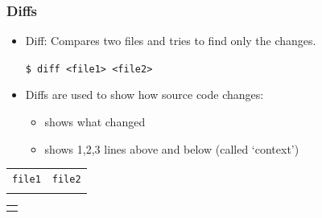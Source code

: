 \documentclass[ignoreframetext,envcountsect]{beamer}
\newif\ifsnop\snoptrue
\newcommand{\bi}{\begin{itemize}}
\newcommand{\ei}{\end{itemize}}
\newcommand{\cemph}[1]{{\color{red}#1}}
\begin{document}
\ifsnop
{}
\fi

\pagestyle{plain}

\ifsnop
\begin{frame}
\frametitle{Diffs}
\bi
\item
  Diff: Compares two files and tries to find only the changes.
  \medskip

  {\tt \$ diff <file1> <file2>}
\bigskip
\item
  Diffs are used to show how source code changes:
  \bi
  \item shows what changed
  \item shows 1,2,3 lines above and below (called `context')
  \ei
\ei
\end{frame}
\fi


\ifsnop
\begin{frame}
\scriptsize
\begin{tabular}{c@{\qquad}c}
\cemph{\tt file1} & \cemph{\tt file2} \\
 &

\end{tabular}
\medskip

\small
\begin{tabular}{c}
\cemph{{\tt \$ diff -c file1 file2}} \\

\end{tabular}
\end{frame}
\fi
\end{document}
